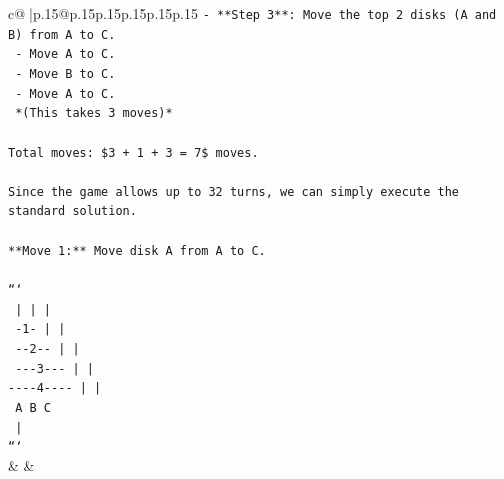 \documentclass{article}
\begin{document}
{\begin{supertabular}{c@{$\;$}|p{.15\linewidth}@{}p{.15\linewidth}p{.15\linewidth}p{.15\linewidth}p{.15\linewidth}p{.15\linewidth}}
{{{\texttt{{-} **Step 3**: Move the top 2 disks (A and B) from A to C.} \\
\texttt{  {-} Move A to C.} \\
\texttt{  {-} Move B to C.} \\
\texttt{  {-} Move A to C.} \\
\texttt{  *(This takes 3 moves)*} \\
\\ 
\texttt{Total moves: \$3 + 1 + 3 = 7\$ moves.} \\
\\ 
\texttt{Since the game allows up to 32 turns, we can simply execute the standard solution.} \\
\\ 
\texttt{**Move 1:** Move disk A from A to C.} \\
\\ 
\texttt{```} \\
\texttt{    |         |         |    } \\
\texttt{   {-}1{-}        |         |    } \\
\texttt{  {-}{-}2{-}{-}       |         |    } \\
\texttt{ {-}{-}{-}3{-}{-}{-}      |         |    } \\
\texttt{{-}{-}{-}{-}4{-}{-}{-}{-}     |         |    } \\
\texttt{    A         B         C    } \\
\texttt{    |} \\
\texttt{```} \\
            }
        }
    }
    & & \\ \\


\end{supertabular}}
\end{document}
